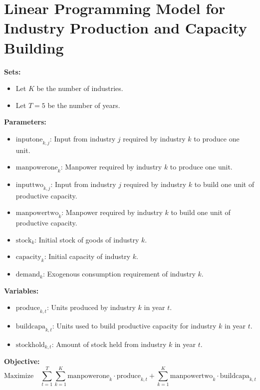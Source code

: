 \documentclass{article}
\begin{document}
\section*{Linear Programming Model for Industry Production and Capacity Building}

\textbf{Sets:}
\begin{itemize}
    \item Let \( K \) be the number of industries.
    \item Let \( T = 5 \) be the number of years.
\end{itemize}

\textbf{Parameters:}
\begin{itemize}
    \item \( \text{inputone}_{k,j} \): Input from industry \( j \) required by industry \( k \) to produce one unit.
    \item \( \text{manpowerone}_k \): Manpower required by industry \( k \) to produce one unit.
    \item \( \text{inputtwo}_{k,j} \): Input from industry \( j \) required by industry \( k \) to build one unit of productive capacity.
    \item \( \text{manpowertwo}_k \): Manpower required by industry \( k \) to build one unit of productive capacity.
    \item \( \text{stock}_k \): Initial stock of goods of industry \( k \).
    \item \( \text{capacity}_k \): Initial capacity of industry \( k \).
    \item \( \text{demand}_k \): Exogenous consumption requirement of industry \( k \).
\end{itemize}

\textbf{Variables:}
\begin{itemize}
    \item \( \text{produce}_{k,t} \): Units produced by industry \( k \) in year \( t \).
    \item \( \text{buildcapa}_{k,t} \): Units used to build productive capacity for industry \( k \) in year \( t \).
    \item \( \text{stockhold}_{k,t} \): Amount of stock held from industry \( k \) in year \( t \).
\end{itemize}

\textbf{Objective:}
\[
\text{Maximize} \quad \sum_{t=1}^{T} \sum_{k=1}^{K} \text{manpowerone}_k \cdot \text{produce}_{k,t} + \sum_{k=1}^{K} \text{manpowertwo}_k \cdot \text{buildcapa}_{k,t}
\]
\end{document}
